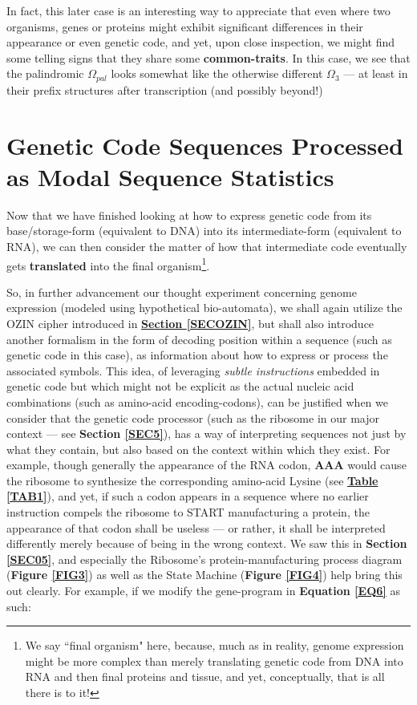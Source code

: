 \documentclass[a4paper, 18pt]{book} %
\begin{document}
In fact, this later case is an interesting way to appreciate that even where two organisms, genes or proteins might exhibit significant differences in their appearance or even genetic code, and yet, upon close inspection, we might find some telling signs that they share some \textbf{common-traits}. In this case, we see that the palindromic $\Omega_{pal}$ looks somewhat like the otherwise different $\Omega_{3}$ --- at least in their prefix structures after transcription (and possibly beyond!)

\section{Genetic Code Sequences Processed as Modal Sequence Statistics}
\label{SECGENEXPRE}

Now that we have finished looking at how to express genetic code from its base/storage-form (equivalent to DNA) into its intermediate-form (equivalent to RNA), we can then consider the matter of how that intermediate code eventually gets \textbf{translated} into the final organism\footnote{We say ``final organism" here, because, much as in reality, genome expression might be more complex than merely translating genetic code from DNA into RNA and then final proteins and tissue, and yet, conceptually, that is all there is to it!}.

So, in further advancement our thought experiment concerning genome expression (modeled using hypothetical bio-automata), we shall again utilize the OZIN cipher introduced in \textbf{\hyperref[SECOZIN]{Section \ref{SECOZIN}}}, but shall also introduce another formalism in the form of decoding position within a sequence (such as genetic code in this case), as information about how to express or process the associated symbols. This idea, of leveraging \textit{subtle instructions} embedded in genetic code but which might not be explicit as the actual nucleic acid combinations (such as amino-acid encoding-codons), can be justified when we consider that the genetic code processor (such as the ribosome in our major context --- see \textbf{Section \ref{SEC5}}), has a way of interpreting sequences not just by what they contain, but also based on the context within which they exist. For example, though generally the appearance of the RNA codon, \textbf{AAA} would cause the ribosome to synthesize the corresponding amino-acid Lysine (see \textbf{\hyperref[TAB1]{Table \ref{TAB1}}}), and yet, if such a codon appears in a sequence where no earlier instruction compels the ribosome to START manufacturing a protein, the appearance of that codon shall be useless --- or rather, it shall be interpreted differently merely because of being in the wrong context. We saw this in \textbf{Section \ref{SEC05}}, and especially the Ribosome's protein-manufacturing process diagram (\textbf{Figure \ref{FIG3}}) as well as the State Machine (\textbf{Figure \ref{FIG4}}) help bring this out clearly. For example, if we modify the gene-program  in \textbf{Equation \ref{EQ6}} as such:
\end{document}
